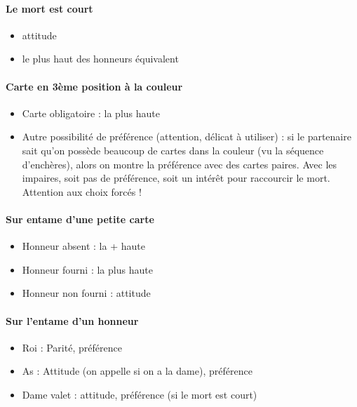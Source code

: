 \documentclass[a4paper]{article}
\begin{document}
\paragraph{Le mort est court}

\begin{itemize}
\item attitude

\item le plus haut des honneurs équivalent

\end{itemize}

\paragraph{Carte en 3ème position à la couleur}

\begin{itemize}
\item Carte obligatoire : la plus haute

\item Autre possibilité de préférence (attention, délicat à utiliser) : si le partenaire sait qu’on possède beaucoup de cartes dans la couleur (vu la séquence d’enchères), alors on montre la préférence avec des cartes paires. Avec les impaires, soit pas de préférence, soit un intérêt pour raccourcir le mort. Attention aux choix forcés !

\end{itemize}

\paragraph{Sur entame d’une petite carte}

\begin{itemize}
\item Honneur absent : la + haute

\item Honneur fourni : la plus haute

\item Honneur non fourni : attitude

\end{itemize}

\paragraph{Sur l’entame d’un honneur}

\begin{itemize}
\item Roi : Parité, préférence

\item As : Attitude (on appelle si on a la dame), préférence

\item Dame valet : attitude, préférence (si le mort est court)

\end{itemize}
\end{document}
